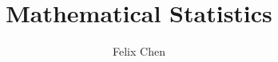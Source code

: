 \documentclass{article}
\begin{document}
	\title{Mathematical Statistics \uppercase\expandafter{}}
	\author{Felix Chen}
	\date{}
	\maketitle
	\tableofcontents
	
\end{document}
